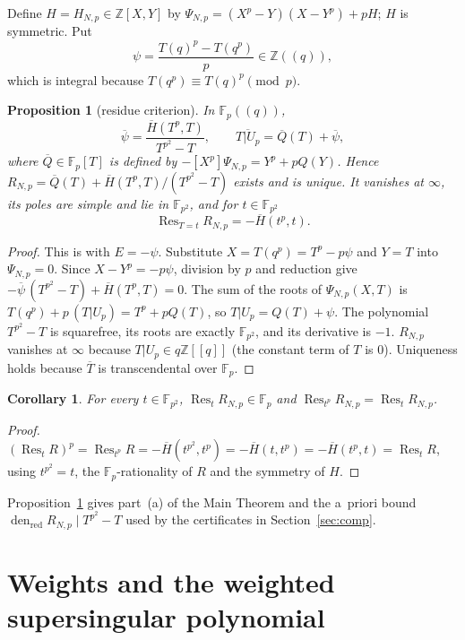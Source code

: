 \documentclass[11pt,a4paper]{article}
\numberwithin{equation}{section}
\newtheorem{proposition}[theorem]{Proposition}
\newtheorem{corollary}[theorem]{Corollary}
\theoremstyle{definition}
\theoremstyle{remark}
\newcommand{\Fp}{\mathbb F_p}
\newcommand{\Fq}{\mathbb F_{p^2}}
\newcommand{\Z}{\mathbb Z}
\newcommand{\Res}{\operatorname{Res}}
\newcommand{\den}{\operatorname{den}_{\mathrm{red}}}
\begin{document}
Define $H=H_{N,p}\in\Z[X,Y]$ by $\Psi_{N,p}=(X^p-Y)(X-Y^p)+pH$; $H$ is symmetric. Put
\[
\psi=\frac{T(q)^p-T(q^p)}{p}\in\Z((q)),
\]
which is integral because $T(q^p)\equiv T(q)^p\pmod p$.

\begin{proposition}[residue criterion]\label{prop:res}
In $\Fp((q))$,
\[
\overline\psi=\frac{\overline H(T^p,T)}{T^{p^2}-T},\qquad
\overline{T|U_p}=\overline Q(T)+\overline\psi,
\]
where $\overline Q\in\Fp[T]$ is defined by $-[X^p]\Psi_{N,p}=Y^p+pQ(Y)$. Hence
$R_{N,p}=\overline Q(T)+\overline H(T^p,T)/(T^{p^2}-T)$ exists and is unique. It vanishes at
$\infty$, its poles are simple and lie in $\Fq$, and for $t\in\Fq$
\[
\Res_{T=t}R_{N,p}=-\overline H(t^p,t).
\]
\end{proposition}
\begin{proof}
This is \citet[Thm.~2.2]{Jordan26} with $E=-\psi$. Substitute $X=T(q^p)=T^p-p\psi$ and $Y=T$ into
$\Psi_{N,p}=0$. Since $X-Y^p=-p\psi$, division by $p$ and reduction give
$-\overline\psi\,(T^{p^2}-T)+\overline H(T^p,T)=0$. The sum of the roots of $\Psi_{N,p}(X,T)$ is
$T(q^p)+p\,(T|U_p)=T^p+pQ(T)$, so $T|U_p=Q(T)+\psi$. The polynomial $T^{p^2}-T$ is squarefree, its
roots are exactly $\Fq$, and its derivative is $-1$. $R_{N,p}$ vanishes at $\infty$ because
$T|U_p\in q\Z[[q]]$ (the constant term of $T$ is $0$). Uniqueness holds because $\overline T$ is
transcendental over $\Fp$.
\end{proof}

\begin{corollary}\label{cor:rFp}
For every $t\in\Fq$, $\Res_{t}R_{N,p}\in\Fp$ and $\Res_{t^p}R_{N,p}=\Res_tR_{N,p}$.
\end{corollary}
\begin{proof}
$(\Res_tR)^p=\Res_{t^p}R=-\overline H(t^{p^2},t^p)=-\overline H(t,t^p)=-\overline H(t^p,t)=\Res_tR$, using
$t^{p^2}=t$, the $\Fp$-rationality of $R$ and the symmetry of $H$.
\end{proof}

Proposition~\ref{prop:res} gives part~(a) of the Main Theorem and the a~priori bound
$\den R_{N,p}\mid T^{p^2}-T$ used by the certificates in Section~\ref{sec:comp}.

\section{Weights and the weighted supersingular polynomial}\label{sec:weights}
\end{document}
